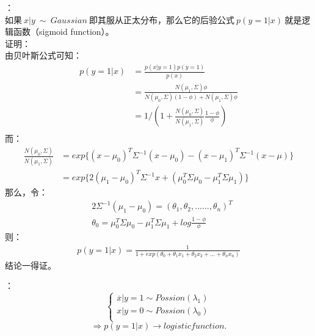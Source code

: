 ：\\
如果$~x|y~\sim~Gaussian~$即其服从正太分布，那么它的后验公式$~p(y=1|x)~$就是逻辑函数（sigmoid function）。\\
证明：\\
由贝叶斯公式可知：
\begin{equation}\nonumber
\begin{split}
  p(y=1|x)&=\frac{p(x|y=1)p(y=1)}{p(x)}\\
          &=\frac{N(\mu_1,\Sigma)\phi}{N(\mu_0,\Sigma)(1-\phi)+N(\mu_1,\Sigma)\phi}\\
          &=1/(1+\frac{N(\mu_0,\Sigma)}{N(\mu_1,\Sigma)}\frac{1-\phi}{\phi})\\
\end{split}
\end{equation}
而：
\begin{equation}\nonumber
\begin{split}
  \frac{N(\mu_0,\Sigma)}{N(\mu_1,\Sigma)}&=exp\{(x-\mu_0)^T\Sigma^{-1}(x-\mu_0)-(x-\mu_1)^T\Sigma^{-1}(x-\mu)\}\\
  &=exp\{2(\mu_1-\mu_0)^T\Sigma^{-1}x+(\mu_0^T\Sigma \mu_0-\mu_1^T\Sigma\mu_1)\}
\end{split}
\end{equation}
那么，令：
\begin{equation}\nonumber
\begin{split}
  &2\Sigma^{-1}(\mu_1-\mu_0)=(\theta_1,\theta_2,......,\theta_n)^T\\
  &\theta_0=\mu_0^T\Sigma\mu_0-\mu_1^T\Sigma\mu_1+log\frac{1-\phi}{\phi}
\end{split}
\end{equation}
则：
\begin{equation}\nonumber
\begin{split}
  p(y=1|x)=\frac{1}{1+exp(\theta_0+\theta_1x_1+\theta_2x_2+...+\theta_nx_n)}
\end{split}
\end{equation}
结论一得证。

：\\
\begin{equation}\nonumber
\left\{
\begin{aligned}
\overset{.}x|y=1\sim Possion(\lambda_1) \\
x|y=0\sim Possion(\lambda_0)\\
\end{aligned}
\right.
\end{equation}
$$\Rightarrow p(y=1|x)\rightarrow logistic function.$$

